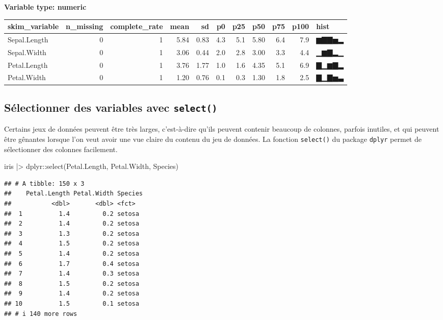 \documentclass[
]{book}
\newenvironment{Shaded}{\begin{snugshade}}{\end{snugshade}}
\newcommand{\FunctionTok}[1]{\textcolor[rgb]{0.00,0.00,0.00}{#1}}
\newcommand{\NormalTok}[1]{#1}
\newcommand{\SpecialCharTok}[1]{\textcolor[rgb]{0.00,0.00,0.00}{#1}}
\begin{document}
\textbf{Variable type: numeric}

\begin{tabular}{l|r|r|r|r|r|r|r|r|r|l}
\hline
skim\_variable & n\_missing & complete\_rate & mean & sd & p0 & p25 & p50 & p75 & p100 & hist\\
\hline
Sepal.Length & 0 & 1 & 5.84 & 0.83 & 4.3 & 5.1 & 5.80 & 6.4 & 7.9 & ▆▇▇▅▂\\
\hline
Sepal.Width & 0 & 1 & 3.06 & 0.44 & 2.0 & 2.8 & 3.00 & 3.3 & 4.4 & ▁▆▇▂▁\\
\hline
Petal.Length & 0 & 1 & 3.76 & 1.77 & 1.0 & 1.6 & 4.35 & 5.1 & 6.9 & ▇▁▆▇▂\\
\hline
Petal.Width & 0 & 1 & 1.20 & 0.76 & 0.1 & 0.3 & 1.30 & 1.8 & 2.5 & ▇▁▇▅▃\\
\hline
\end{tabular}

\hypertarget{suxe9lectionner-des-variables-avec-select}{%
\subsection{\texorpdfstring{Sélectionner des variables avec \texttt{select()}}{Sélectionner des variables avec select()}}\label{suxe9lectionner-des-variables-avec-select}}

Certains jeux de données peuvent être très larges, c'est-à-dire qu'ils peuvent contenir beaucoup de colonnes, parfois inutiles, et qui peuvent être gênantes lorsque l'on veut avoir une vue claire du contenu du jeu de données. La fonction \texttt{select()} du package \texttt{dplyr} permet de sélectionner des colonnes facilement.

\begin{Shaded}
\begin{Highlighting}[]
\NormalTok{iris }\SpecialCharTok{|\textgreater{}} 
\NormalTok{  dplyr}\SpecialCharTok{::}\FunctionTok{select}\NormalTok{(Petal.Length, Petal.Width, Species)}
\end{Highlighting}
\end{Shaded}

\begin{verbatim}
## # A tibble: 150 x 3
##    Petal.Length Petal.Width Species
##           <dbl>       <dbl> <fct>  
##  1          1.4         0.2 setosa 
##  2          1.4         0.2 setosa 
##  3          1.3         0.2 setosa 
##  4          1.5         0.2 setosa 
##  5          1.4         0.2 setosa 
##  6          1.7         0.4 setosa 
##  7          1.4         0.3 setosa 
##  8          1.5         0.2 setosa 
##  9          1.4         0.2 setosa 
## 10          1.5         0.1 setosa 
## # i 140 more rows
\end{verbatim}
\end{document}
